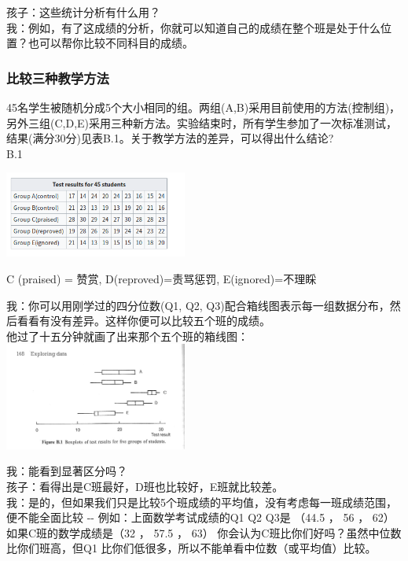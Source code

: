 孩子：这些统计分析有什么用？\\
我：例如，有了这成绩的分析，你就可以知道自己的成绩在整个班是处于什么位置？也可以帮你比较不同科目的成绩。

\hypertarget{ux6bd4ux8f83ux4e09ux79cdux6559ux5b66ux65b9ux6cd5}{%
\subsubsection{比较三种教学方法}\label{ux6bd4ux8f83ux4e09ux79cdux6559ux5b66ux65b9ux6cd5}}

45名学生被随机分成5个大小相同的组。两组(A,B)采用目前使用的方法(控制组)，另外三组(C,D,E)采用三种新方法。实验结束时，所有学生参加了一次标准测试，结果(满分30分)见表B.1。关于教学方法的差异，可以得出什么结论?\\
B.1

\includegraphics[width=6cm]{Screenshotfrom2023-01-0222-13-24.png}

C (praised) = 赞赏, D(reproved)=责骂惩罚, E(ignored)=不理睬

我：你可以用刚学过的四分位数(Q1, Q2, Q3)配合箱线图表示每一组数据分布，然后看看有没有差异。这样你便可以比较五个班的成绩。\\
他过了十五分钟就画了出来那个五个班的箱线图：\\

\includegraphics[width=6cm]{图片61-3.png}

我：能看到显著区分吗？\\
孩子：看得出是C班最好，D班也比较好，E班就比较差。\\
我：是的，但如果我们只是比较5个班成绩的平均值，没有考虑每一班成绩范围，便不能全面比较
-\/- 例如：上面数学考试成绩的Q1 Q2 Q3是 （44.5 ， 56 ， 62）
如果C班的数学成绩是（32 ， 57.5 ， 63）
你会认为C班比你们好吗？虽然中位数比你们班高，但Q1
比你们低很多，所以不能单看中位数（或平均值）比较。

